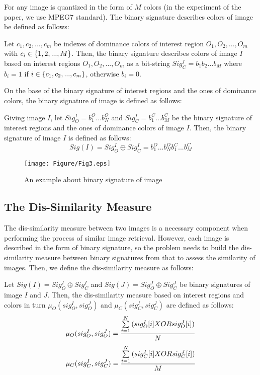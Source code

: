 \documentclass{amcs}
\begin{document}
For any image is quantized in the form of $M$ colors (in the experiment of the paper, we use MPEG7 standard). The binary signature describes colors of image be defined as follows: 
\begin{definition}{} Let ${c_1},{c_2},...,{c_m}$ be indexes of dominance colors of interest region ${O_1},{O_2},...,{O_m}$ with ${c_i} \in {\rm{\{ }}1,2,...,M{\rm{\} }}$. Then, the binary signature describes colors of image $I$ based on interest regions ${O_1},{O_2},...,{O_m}$ as a bit-string $Sig_C^I = {b_1}{b_2}...{b_M}$ where ${b_i} = 1$ if $i \in {\rm{\{ }}{c_1},{c_2},...,{c_m}{\rm{\} }}$, otherwise ${b_i} = 0$.
\label{Signature-def3}
\end{definition}

On the base of the binary signature of interest regions and the ones of dominance colors, the binary signature of image is defined as follows:
\begin{definition}{} Giving image $I$, let $Sig_O^I = b_1^O...b_N^O$ and $Sig_C^I = b_1^C...b_M^C$ be the binary signature of interest regions and the ones of dominance colors of image $I$. Then, the binary signature of image $I$ is defined as follows:
\begin{equation}
 Sig(I) = Sig_O^I \oplus Sig_C^I = b_1^O...b_N^Ob_1^C...b_M^C
\end{equation}
\label{def:image-signature}
\end{definition}

\begin{figure}[!ht]
	\centering
		\texttt{[image: Figure/Fig3.eps]}
		\caption{An example about binary signature of image}
\end{figure}

\subsection{The Dis-Similarity Measure}
The dis-similarity measure between two images is a necessary component when performing the process of similar image retrieval. However, each image is described in the form of binary signature, so the problem needs to build the dis-similarity measure between binary signatures from that to assess the similarity of images. Then, we define the dis-similarity measure as follows:
\begin{definition}{} Let $Sig(I) = Sig_O^I \oplus Sig_C^I$ and $Sig(J) = Sig_O^J \oplus Sig_C^J$ be binary signatures of image $I$ and $J$. Then, the dis-similarity measure based on interest regions and colors in turn ${\mu _O}(sig_O^I,sig_O^J)$ and ${\mu _C}(sig_C^I,sig_C^J)$ are defined as follows:
\begin{equation}
{\mu _O}(sig_O^I,sig_O^J) \\= \frac{{\sum\limits_{i = 1}^N {(sig_O^I{\rm{[}}i]{\rm{ }}XOR{\rm{ }}sig_O^J{\rm{[}}i])} }}{N}
\label{eq:mO}
\end{equation}
\begin{equation}
{\mu _C}(sig_C^I,sig_C^J) \\= \frac{{\sum\limits_{i = 1}^N {(sig_C^I{\rm{[}}i]{\rm{ }}XOR{\rm{ }}sig_C^J{\rm{[}}i])} }}{M}
\label{eq:mC}
\end{equation}
\end{definition}
\end{document}

